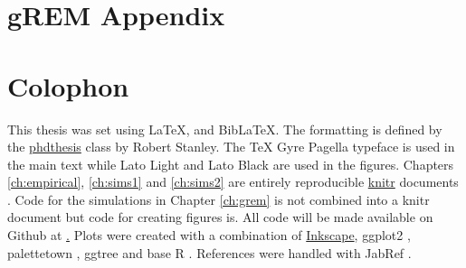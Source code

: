 
\appendix
\chapter{gREM Appendix}
\label{gremAppendix}




\chapter{Colophon}
\label{appendixlabel3}


This thesis was set using \LaTeX, \XeLaTeX\vspace{1mm} and Bib\LaTeX. \vspace{-0.12cm} 
The formatting is defined by the \href{https://github.com/robjstan/latex-phdthesis}{phdthesis} class by Robert Stanley.
The TeX Gyre Pagella typeface is used in the main text while { Lato Light} and { \color[rgb]{0.75,0.75,0.75} Lato Black} are used in the figures.
Chapters \ref{ch:empirical}, \ref{ch:sims1} and \ref{ch:sims2} are entirely reproducible \href{http://yihui.name/knitr/}{knitr} documents \cite{knitr}.
Code for the simulations in Chapter \ref{ch:grem} is not combined into a knitr document but code for creating figures is.
All code will be made available on Github at \href{https://github.com/timcdlucas/PhDThesis}. %
Plots were created with a combination of \href{www.inkscape.org}{Inkscape}, ggplot2 \cite{ggplot2}, palettetown \cite{palettetown}, ggtree \cite{ggtree} and base R \cite{R}.
References were handled with JabRef \cite{JabRef_software}. 

